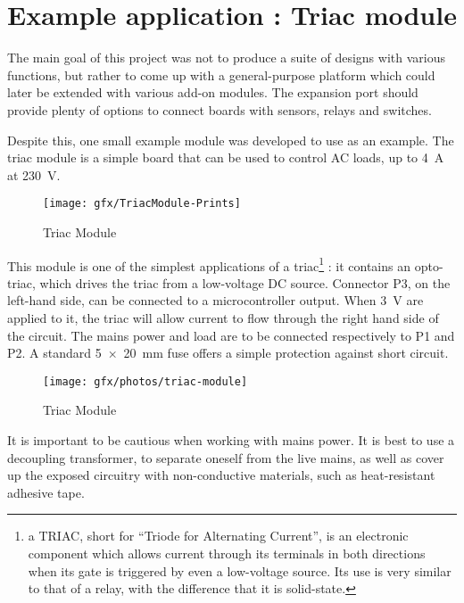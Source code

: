 \section{Example application : Triac module}

The main goal of this project was not to produce a suite of designs with various
functions, but rather to come up with a general-purpose platform which could
later be extended with various add-on modules. The expansion port should provide
plenty of options to connect boards with sensors, relays and switches.

Despite this, one small example module was developed to use as an example. The
triac module is a simple board that can be used to control AC loads, up to
\SI{4}{A} at \SI{230}{V}.

\begin{figure}[htb]
  \begin{center}
    \texttt{[image: gfx/TriacModule-Prints]}
  \end{center}
  \caption{Triac Module}
  \label{fig:triac-module}
\end{figure}

This module is one of the simplest applications of a triac\footnote{a TRIAC,
short for ``Triode for Alternating Current'', is an electronic component which
allows current through its terminals in both directions when its gate is
triggered by even a low-voltage source. Its use is very similar to that of
a relay, with the difference that it is solid-state.}
: it contains an opto-triac, which drives the triac from a low-voltage DC
source. Connector P3, on the left-hand side, can be connected to
a microcontroller output. When \SI{3}{V} are applied to it, the triac will allow
current to flow through the right hand side of the circuit. The mains power and
load are to be connected respectively to P1 and P2. A standard \SI{5x20}{mm}
fuse offers a simple protection against short circuit.

\begin{figure}[htb]
  \begin{center}
    \texttt{[image: gfx/photos/triac-module]}
  \end{center}
  \caption{Triac Module}
  \label{fig:triac-module-photo}
\end{figure}

It is important to be cautious when working with mains power. It is best to use
a decoupling transformer, to separate oneself from the live mains, as well as
cover up the exposed circuitry with non-conductive materials, such as
heat-resistant adhesive tape.

